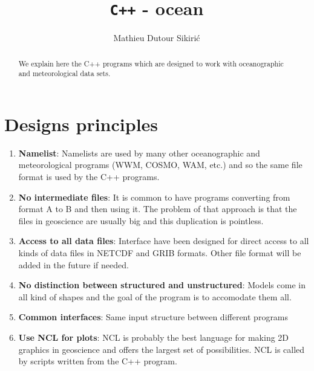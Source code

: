 \documentclass[12pt]{amsart}
\begin{document}
\author{Mathieu Dutour Sikiri\'c}
\address{Mathieu Dutour Sikiri\'c, Rudjer Boskovi\'c Institute, Bijenicka 54, 10000 Zagreb, Croatia, Fax: +385-1-468-0245}







\title{{\tt C++} - ocean}


\maketitle

\begin{abstract}
We explain here the C++ programs which are designed to work with oceanographic and meteorological data sets.
\end{abstract}

\section{Designs principles}

\begin{enumerate}
\item {\bf Namelist}: Namelists are used by many other oceanographic and meteorological programs (WWM, COSMO, WAM, etc.) and so the same file format is used by the C++ programs.
\item {\bf No intermediate files}: It is common to have programs converting from format A to B and then using it. The problem of that approach is that the files in geoscience are usually big and this duplication is pointless.
\item {\bf Access to all data files}: Interface have been designed for direct access to all kinds of data files in NETCDF and GRIB formats. Other file format will be added in the future if needed.
\item {\bf No distinction between structured and unstructured}: Models come in all kind of shapes and the goal of the program is to accomodate them all.
\item {\bf Common interfaces}: Same input structure between different programs
\item {\bf Use NCL for plots}: NCL is probably the best language for making 2D graphics in geoscience and offers the largest set of possibilities. NCL is called by scripts written from the C++ program.
\end{enumerate}
\end{document}
